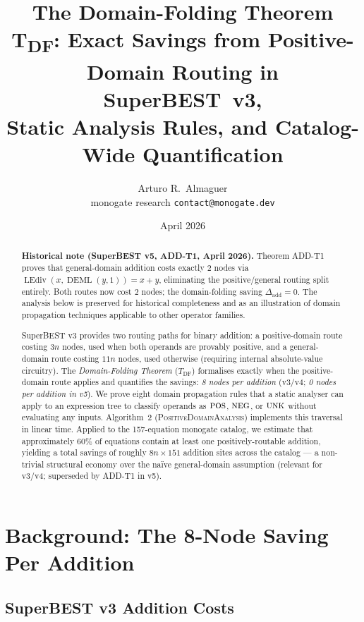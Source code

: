 \documentclass[12pt,a4paper]{article}
\title{The Domain-Folding Theorem\\[6pt]
       \large T\textsubscript{DF}: Exact Savings from Positive-Domain Routing
       in SuperBEST~v3,\\
       Static Analysis Rules, and Catalog-Wide Quantification}
\author{Arturo R.\ Almaguer\\
\small monogate research \quad \texttt{contact@monogate.dev}}
\date{April 2026}
\theoremstyle{definition}
\newcommand{\DEML}{\operatorname{DEML}}
\newcommand{\LEdiv}{\operatorname{LEdiv}}
\newcommand{\POS}{\textsc{pos}}
\newcommand{\NEG}{\textsc{neg}}
\newcommand{\UNK}{\textsc{unk}}
\begin{document}
\maketitle

\begin{abstract}
\textbf{Historical note (SuperBEST v5, ADD-T1, April 2026).}
Theorem ADD-T1 proves that general-domain addition costs exactly 2 nodes via
$\LEdiv(x,\DEML(y,1)) = x+y$, eliminating the positive/general routing split
entirely.  Both routes now cost 2 nodes; the domain-folding saving $\Delta_{\mathrm{add}} = 0$.
The analysis below is preserved for historical completeness and as an illustration
of domain propagation techniques applicable to other operator families.
\bigskip

SuperBEST v3 provides two routing paths for binary addition: a positive-domain
route costing $3n$ nodes, used when both operands are provably positive, and a
general-domain route costing $11n$ nodes, used otherwise (requiring internal
absolute-value circuitry).
The \emph{Domain-Folding Theorem} ($T_{\mathrm{DF}}$) formalises exactly when the
positive-domain route applies and quantifies the savings: \emph{8 nodes per
addition} (v3/v4; \emph{0 nodes per addition in v5}).
We prove eight domain propagation rules that a static analyser can apply to an
expression tree to classify operands as $\POS$, $\NEG$, or $\UNK$ without
evaluating any inputs.
Algorithm~2 (\textsc{PositiveDomainAnalysis}) implements this traversal in
linear time.
Applied to the 157-equation monogate catalog, we estimate that approximately
60\% of equations contain at least one positively-routable addition, yielding a
total savings of roughly $8n \times 151$ addition sites across the catalog ---
a non-trivial structural economy over the na\"{i}ve general-domain assumption
(relevant for v3/v4; superseded by ADD-T1 in v5).
\end{abstract}

\tableofcontents
\bigskip

\section{Background: The 8-Node Saving Per Addition}
\label{sec:background}

\subsection{SuperBEST v3 Addition Costs}
\end{document}
